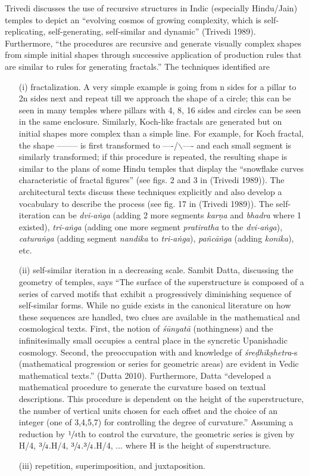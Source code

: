 Trivedi discusses the use of recursive structures in Indic (especially Hindu/Jain) temples to depict an “evolving cosmos of growing complexity, which is self-replicating, self-generating, self-similar and dynamic” (Trivedi 1989). Furthermore, “the procedures are recursive and generate visually complex shapes from simple initial shapes through successive application of production rules that are similar to rules for generating fractals.” The techniques identified are 
\begin{itemize}
\item[(i)] fractalization. A very simple example is going from n sides for a pillar to 2n sides next and repeat till we approach the shape of a circle; this can be seen in many temples where pillars with 4, 8, 16 sides and circles can be seen in the same enclosure. Similarly, Koch-like fractals are generated but on initial shapes more complex than a simple line. For example, for Koch fractal, the shape -------- is first transformed to ----/$\backslash$---- and each small segment is similarly transformed; if this procedure is repeated, the resulting shape is similar to the plans of some Hindu temples that display the “snowflake curves characteristic of fractal figures” (see figs. 2 and 3 in (Trivedi 1989)). The architectural texts discuss these techniques explicitly and also develop a vocabulary to describe the process (see fig. 17 in (Trivedi 1989)). The self-iteration can be \textsl{dvi-aṅga} (adding 2 more segments \textsl{karṇa} and \textsl{bhadra} where 1 existed), \textsl{tri-aṅga} (adding one more segment \textsl{pratiratha} to the \textsl{dvi-aṅga}), \textsl{caturaṅga} (adding segment \textsl{nandika} to \textsl{tri-aṅga}), \textsl{pañcāṅga} (adding \textsl{konika}), etc. 

\item[(ii)] self-similar iteration in a decreasing scale. Sambit Datta, discussing the geometry of temples, says “The surface of the superstructure is composed of a series of carved motifs that exhibit a progressively diminishing sequence of self-similar forms. While no guide exists in the canonical literature on how these sequences are handled, two clues are available in the mathematical and cosmological texts. First, the notion of \textsl{śūnyatā} (nothingness) and the infinitesimally small occupies a central place in the syncretic Upanishadic cosmology. Second, the preoccupation with and knowledge of \textsl{śreḍhīkṣhetra}-s (mathematical progression or series for geometric areas) are evident in Vedic mathematical texts.” (Dutta 2010). Furthermore, Datta “developed a mathematical procedure to generate the curvature based on textual descriptions. This procedure is dependent on the height of the superstructure, the number of vertical units chosen for each offset and the choice of an integer (one of 3,4,5,7) for controlling the degree of curvature.” Assuming a reduction by $\sfrac{1}{4}$th to control the curvature, the geometric series is given by H/4, $\sfrac{3}{4}$.H/4, $\sfrac{3}{4}$.$\sfrac{3}{4}$.H/4, ... where H is the height of superstructure.

\item[(iii)] repetition, superimposition, and juxtaposition.
\end{itemize}

